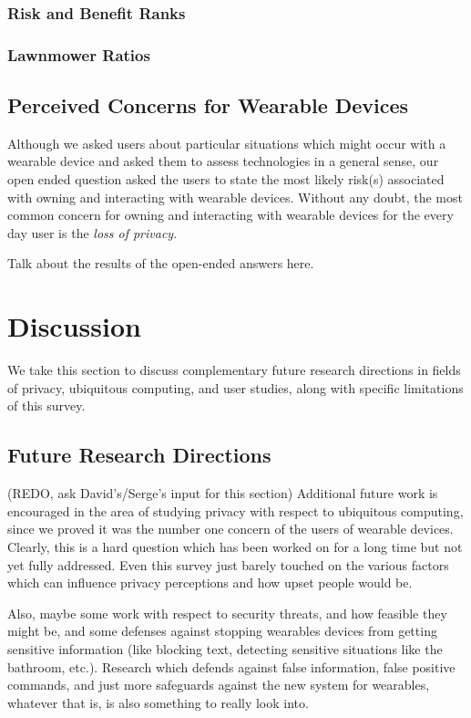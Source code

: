 \documentclass{acm_proc_article-sp}
\begin{document}
\subsubsection{Risk and Benefit Ranks} 
\subsubsection{Lawnmower Ratios} 

\subsection{Perceived Concerns for Wearable Devices}

Although we asked users about particular situations which might occur with a wearable device and asked them to assess technologies in a general sense, our open ended question asked the users to state the most likely risk(s) associated with owning and interacting with wearable devices. Without any doubt, the most common concern for owning and interacting with wearable devices for the every day user is the \textit{loss of privacy}. 

Talk about the results of the open-ended answers here. 


\section{Discussion}
We take this section to discuss complementary future research directions in fields of privacy, ubiquitous computing, and user studies, along with specific limitations of this survey. 

\subsection{Future Research Directions}
(REDO, ask David's/Serge's input for this section) Additional future work is encouraged in the area of studying privacy with respect to ubiquitous computing, since we proved it was the number one concern of the users of wearable devices. Clearly, this is a hard question which has been worked on for a long time but not yet fully addressed. Even this survey just barely touched on the various factors which can influence privacy perceptions and how upset people would be. 

 Also, maybe some work with respect to security threats, and how feasible they might be, and some defenses against stopping wearables devices from getting sensitive information (like blocking text, detecting sensitive situations like the bathroom, etc.). Research which defends against false information, false positive commands, and just more safeguards against the new system for wearables, whatever that is, is also something to really look into. 
 
\end{document}
